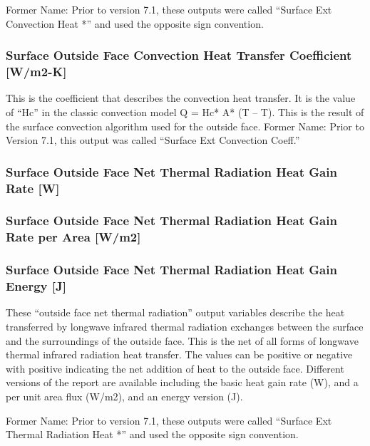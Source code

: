 Former Name: Prior to version 7.1, these outputs were called ``Surface Ext Convection Heat *'' and used the opposite sign convention.

\subsubsection{Surface Outside Face Convection Heat Transfer Coefficient {[}W/m2-K{]}}\label{surface-outside-face-convection-heat-transfer-coefficient-wm2-k}

This is the coefficient that describes the convection heat transfer. It is the value of ``Hc'' in the classic convection model Q = Hc* A* (T -- T). This is the result of the surface convection algorithm used for the outside face. Former Name: Prior to Version 7.1, this output was called ``Surface Ext Convection Coeff.''

\subsubsection{Surface Outside Face Net Thermal Radiation Heat Gain Rate {[}W{]}}\label{surface-outside-face-net-thermal-radiation-heat-gain-rate-w}

\subsubsection{Surface Outside Face Net Thermal Radiation Heat Gain Rate per Area {[}W/m2{]}}\label{surface-outside-face-net-thermal-radiation-heat-gain-rate-per-area-wm2}

\subsubsection{Surface Outside Face Net Thermal Radiation Heat Gain Energy {[}J{]}}\label{surface-outside-face-net-thermal-radiation-heat-gain-energy-j}

These ``outside face net thermal radiation'' output variables describe the heat transferred by longwave infrared thermal radiation exchanges between the surface and the surroundings of the outside face. This is the net of all forms of longwave thermal infrared radiation heat transfer. The values can be positive or negative with positive indicating the net addition of heat to the outside face. Different versions of the report are available including the basic heat gain rate (W), and a per unit area flux (W/m2), and an energy version (J).

Former Name: Prior to version 7.1, these outputs were called ``Surface Ext Thermal Radiation Heat *'' and used the opposite sign convention.

